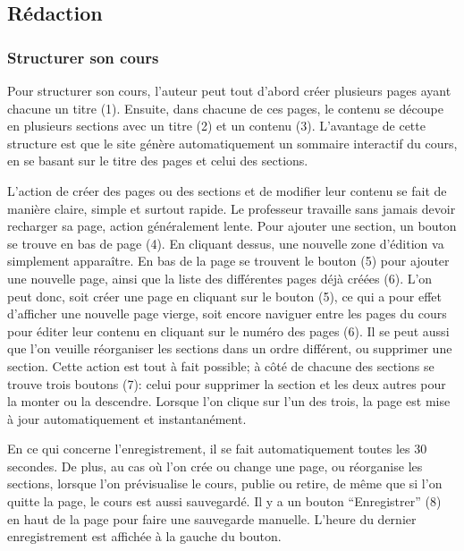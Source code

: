 \documentclass[a4paper,10pt,twoside]{sphinxmanual}
\begin{document}
\subsection{Rédaction}
\label{functionalities:redaction}

\subsubsection{Structurer son cours}
\label{functionalities:structurer-son-cours}
Pour structurer son cours, l'auteur peut tout d'abord créer plusieurs pages ayant chacune un titre (1). Ensuite, dans chacune de ces pages, le contenu se découpe en plusieurs sections avec un titre (2) et un contenu (3). L'avantage de cette structure est que le site génère automatiquement un sommaire interactif du cours, en se basant sur le titre des pages et celui des sections.

L'action de créer des pages ou des sections et de modifier leur contenu se fait de manière claire, simple et surtout rapide. Le professeur travaille sans jamais devoir recharger sa page, action généralement lente. Pour ajouter une section, un bouton se trouve en bas de page (4). En cliquant dessus, une nouvelle zone d'édition va simplement apparaître. En bas de la page se trouvent le bouton (5) pour ajouter une nouvelle page, ainsi que la liste des différentes pages déjà créées (6). L'on peut donc, soit créer une page en cliquant sur le bouton (5), ce qui a pour effet d'afficher une nouvelle page vierge, soit encore naviguer entre les pages du cours pour éditer leur contenu en cliquant sur le numéro des pages (6). Il se peut aussi que l'on veuille réorganiser les sections dans un ordre différent, ou supprimer une section. Cette action est tout à fait possible; à côté de chacune des sections se trouve trois boutons (7): celui pour supprimer la section et les deux autres pour la monter ou la descendre. Lorsque l'on clique sur l'un des trois, la page est mise à jour automatiquement et instantanément.

En ce qui concerne l'enregistrement, il se fait automatiquement toutes les 30 secondes. De plus, au cas où l'on crée ou change une page, ou réorganise les sections, lorsque l'on prévisualise le cours, publie ou retire, de même que si l'on quitte la page, le cours est aussi sauvegardé. Il y a un bouton ``Enregistrer'' (8) en haut de la page pour faire une sauvegarde manuelle. L'heure du dernier enregistrement est affichée à la gauche du bouton.
\end{document}

